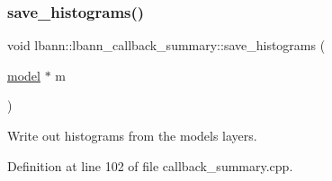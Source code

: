 \mbox{\label{classlbann_1_1lbann__callback__summary_a72a46c51527a02516584ce1e49e5cd29}} 
\subsubsection{\texorpdfstring{save\+\_\+histograms()}{save\_histograms()}}
{\footnotesize\ttfamily void lbann\+::lbann\+\_\+callback\+\_\+summary\+::save\+\_\+histograms (\begin{DoxyParamCaption}\item[{\hyperlink{classlbann_1_1model}{model} $\ast$}]{m }\end{DoxyParamCaption})\hspace{0.3cm}{\ttfamily [protected]}}

Write out histograms from the model\textquotesingle{}s layers. 

Definition at line 102 of file callback\+\_\+summary.\+cpp.


